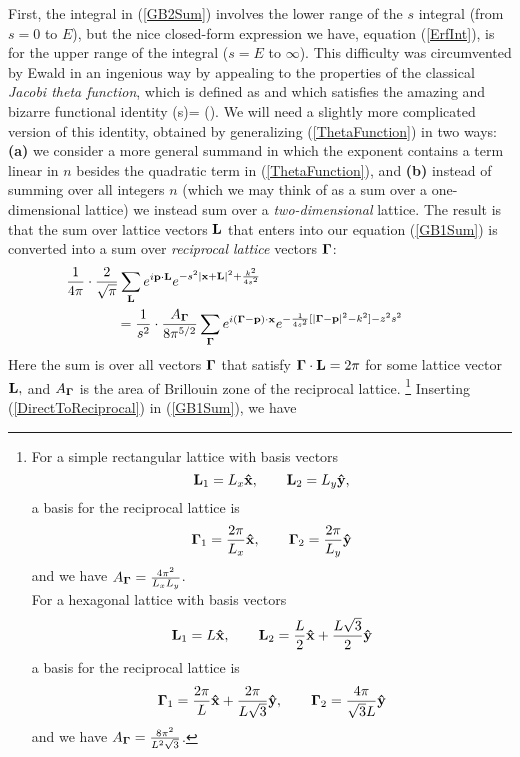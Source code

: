 \documentclass[letterpaper]{article}
\begin{document}
First, the integral in (\ref{GB2Sum}) involves the lower range of the 
$s$ integral (from $s=0$ to $E$), but the nice closed-form
expression we have, equation (\ref{ErfInt}), is for the upper range 
of the integral ($s=E$ to $\infty$). This difficulty was circumvented 
by Ewald in an ingenious way by appealing to the properties of the 
classical \textit{Jacobi theta function}, which is defined as 
and which satisfies the amazing and bizarre functional identity 
{ \theta(s)=\sqrt{} \cdot \theta\left(\right).}
We will need a slightly more complicated version of this identity,
obtained by generalizing (\ref{ThetaFunction}) in two ways: 
\textbf{(a)} we consider a more general summand in which the exponent
contains a term linear in $n$ besides the quadratic term 
in (\ref{ThetaFunction}), and 
\textbf{(b)} instead of summing over all integers $n$ (which we may 
think of as a sum over a one-dimensional lattice) we instead sum 
over a \textit{two-dimensional} lattice.
The result is that the sum over lattice vectors $\mathbf{L}$ that enters into
our equation (\ref{GB1Sum}) is converted into a sum over
\textit{reciprocal lattice} vectors $\boldsymbol{\Gamma}$:
\begin{align}
&\hspace{-0.5in}
 \frac{1}{4\pi} \cdot \frac{2}{\sqrt\pi} \sum_{\vb L} e^{i \vb p \cdot \vb L}
 e^{-s^2|\vb x + \vb L|^2 + \frac{k^2}{4s^2}}
\nn
&=\frac{1}{s^2} \cdot \frac{A_{\BG}}{8\pi^{5/2}}
 \sum_{\BG} e^{i(\BG-\vb p) \cdot \vb x} 
            e^{-\frac{1}{4s^2}[|\BG - \vb p|^2 - k^2] - z^2 s^2}
\label{DirectToReciprocal}
\end{align}
Here the sum is over all vectors $\boldsymbol{\Gamma}$ that satisfy 
$\boldsymbol{\Gamma} \cdot \mathbf{L}=2\pi$ for some lattice vector $\mathbf{L},$
and $A_{\boldsymbol{\Gamma}}$ is the area of Brillouin zone of the 
reciprocal lattice.
\footnote{For a simple rectangular lattice with basis vectors 
$$\mathbf{L}_1=L_x\mathbf{\hat x}, \qquad \mathbf{L}_2=L_y\mathbf{\hat y},$$
a basis for the reciprocal lattice is 
$$\boldsymbol{\Gamma}_1=\frac{2\pi}{L_x}\mathbf{\hat x},\qquad \boldsymbol{\Gamma}_2=\frac{2\pi}{L_y}\mathbf{\hat y}$$
and we have $A_{\boldsymbol{\Gamma}}=\frac{4\pi^2}{L_x L_y}$.\\
For a hexagonal lattice with basis vectors 
$$ \mathbf{L}_1=L\mathbf{\hat x}, \qquad 
   \mathbf{L}_2=\frac{L}{2}\mathbf{\hat x} + \frac{L\sqrt{3}}{2}\mathbf{\hat y}
$$
a basis for the reciprocal lattice is 
$$ \boldsymbol{\Gamma}_1=\frac{2\pi}{L}\mathbf{\hat x} + \frac{2\pi}{L\sqrt{3}}\mathbf{\hat y},
   \qquad 
   \boldsymbol{\Gamma}_2=\frac{4\pi}{\sqrt{3} L}\mathbf{\hat y}
$$
and we have $A_{\boldsymbol{\Gamma}}=\frac{8\pi^2}{L^2 \sqrt{3}}$.
}
Inserting (\ref{DirectToReciprocal}) in (\ref{GB1Sum}), we have 
\end{document}
